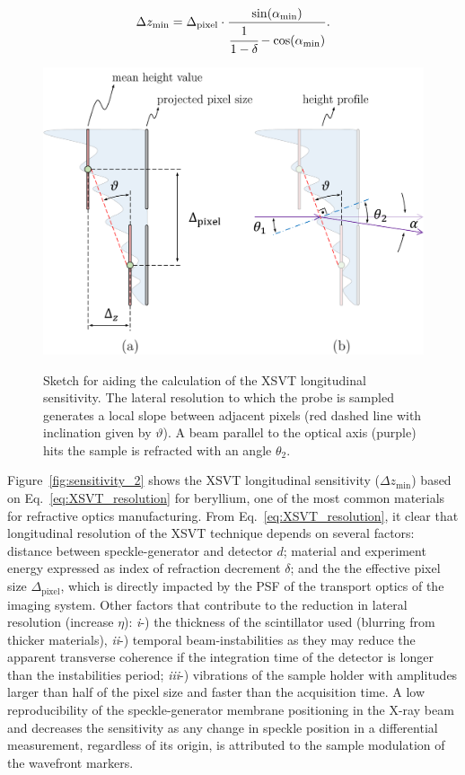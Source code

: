 \begin{refsection}
\begin{align}\label{eq:XSVT_resolution}
\Delta{z_{\text{min}}}=\Delta_\text{pixel}\cdot\frac{\sin(\alpha_\text{min})}{\cfrac{1}{1-\delta}-\cos(\alpha_\text{min})}.
\end{align}
\begin{figure}[ht]
        \centering
        {\includegraphics[width=0.5\linewidth]{figures/ch04b/sensitivity.pdf}}
        \caption[XSVT sensitivity calculation sketch]{Sketch for aiding the calculation of the XSVT longitudinal sensitivity. The lateral resolution to which the probe is sampled generates a local slope between adjacent pixels (red dashed line with inclination given by $\vartheta$). A beam parallel to the optical axis (purple) hits the sample is refracted with an angle $\theta_2$.}\label{fig:sensitivity}
\end{figure}
Figure~\ref{fig:sensitivity_2} shows the XSVT longitudinal sensitivity ($\Delta{z_{\text{min}}}$) based on Eq.~\ref{eq:XSVT_resolution} for beryllium, one of the most common materials for refractive optics manufacturing. From Eq.~\ref{eq:XSVT_resolution}, it clear that longitudinal resolution of the XSVT technique depends on several factors: distance between speckle-generator and detector $d$; material and experiment energy expressed as index of refraction decrement $\delta$; and the the effective pixel size $\Delta_\text{pixel}$, which is directly impacted by the PSF of the transport optics of the imaging system. Other factors that contribute to the reduction in lateral resolution (increase $\eta$): \textit{i}-) the thickness of the scintillator used (blurring from thicker materials), \textit{ii}-) temporal beam-instabilities as they may reduce the apparent transverse coherence if the integration time of the detector is longer than the instabilities period; \textit{iii}-) vibrations of the sample holder with amplitudes larger than half of the pixel size and faster than the acquisition time. A low reproducibility of the speckle-generator membrane positioning in the X-ray beam and decreases the sensitivity as any change in speckle position in a differential measurement, regardless of its origin, is attributed to the sample modulation of the wavefront markers.  


\end{refsection}
